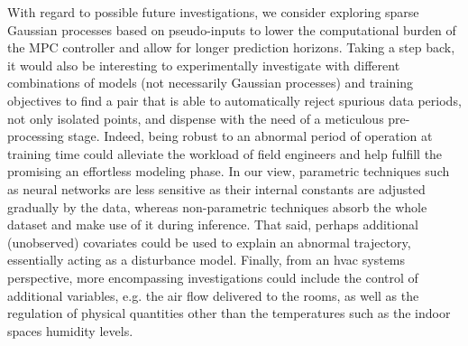 With regard to possible future investigations, we consider exploring sparse Gaussian processes based on pseudo-inputs \citep{bauer2016understanding} to lower the computational burden of the MPC controller and allow for longer prediction horizons. Taking a step back, it would also be interesting to experimentally investigate with different combinations of models (not necessarily Gaussian processes) and training objectives to find a pair that is able to automatically reject spurious data periods, not only isolated points, and dispense with the need of a meticulous pre-processing stage. Indeed, being robust to an abnormal period of operation at training time could alleviate the workload of field engineers and help fulfill the promising an effortless modeling phase. In our view, parametric techniques such as neural networks are less sensitive as their internal constants are adjusted gradually by the data, whereas non-parametric techniques absorb the whole dataset and make use of it during inference. That said, perhaps additional (unobserved) covariates could be used to explain an abnormal trajectory, essentially acting as a disturbance model. Finally, from an \ac{hvac} systems perspective, more encompassing investigations could include the control of additional variables, e.g. the air flow delivered to the rooms, as well as the regulation of physical quantities other than the temperatures such as the indoor spaces humidity levels.





